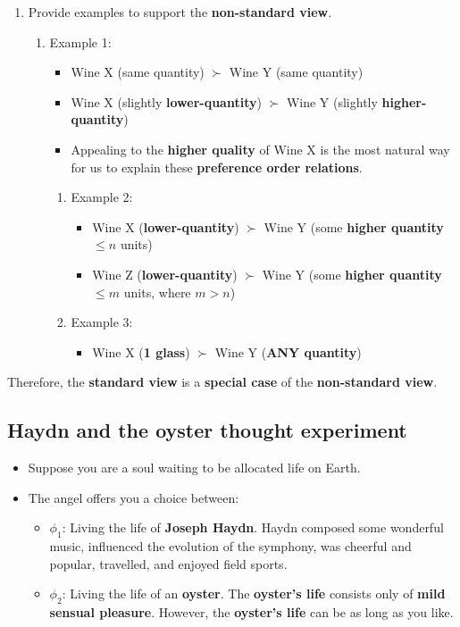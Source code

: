 \documentclass[11pt]{article}
\begin{document}
\begin{enumerate}
\item Provide examples to support the \textbf{non-standard view}.
\begin{enumerate}
\item Example 1:
\begin{itemize}
\item Wine X (same quantity) \(\succ\) Wine Y (same quantity)
\item Wine X (slightly \textbf{lower-quantity}) \(\succ\) Wine Y (slightly \textbf{higher-quantity})
\item Appealing to the \textbf{higher quality} of Wine X is the most natural way for us to explain these \textbf{preference order relations}.
\end{itemize}
\begin{enumerate}
\item Example 2:
\begin{itemize}
\item Wine X (\textbf{lower-quantity}) \(\succ\) Wine Y (some \textbf{higher quantity} \(\le n\) units)
\item Wine Z (\textbf{lower-quantity}) \(\succ\) Wine Y (some \textbf{higher quantity} \(\le m\) units, where \(m > n\))
\end{itemize}
\item Example 3:
\begin{itemize}
\item Wine X (\textbf{1 glass}) \(\succ\) Wine Y (\textbf{ANY quantity})
\end{itemize}
\end{enumerate}
\end{enumerate}
\end{enumerate}

Therefore, the \textbf{standard view} is a \textbf{special case} of the \textbf{non-standard view}.

 \newpage
\subsection{Haydn and the oyster thought experiment}
\label{sec:org7a13618}
\begin{itemize}
\item Suppose you are a soul waiting to be allocated life on Earth.
\item The angel offers you a choice between:
\begin{itemize}
\item \(\phi_1\): Living the life of \textbf{Joseph Haydn}. Haydn composed some wonderful music, influenced the evolution of the symphony, was cheerful and popular, travelled, and enjoyed field sports.
\item \(\phi_2\): Living the life of an \textbf{oyster}. The \textbf{oyster's life} consists only of \textbf{mild sensual pleasure}. However, the \textbf{oyster's life} can be as long as you like.
\end{itemize}
\end{itemize}
\end{document}
